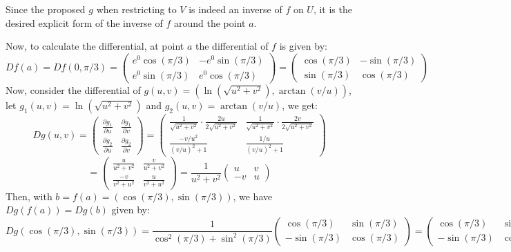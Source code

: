 \documentclass{article}
\begin{document}
\begin{itemize}
    Since the proposed $g$ when restricting to $V$ is indeed an inverse of $f$ on $U$, it is the desired explicit form of the inverse of $f$ around the point $a$.

    \hfil

    Now, to calculate the differential, at point $a$ the differential of $f$ is given by:
    $$Df(a) = Df(0,\pi/3) = \begin{pmatrix}
        e^0\cos(\pi/3) & -e^0\sin(\pi/3)\\
        e^0\sin(\pi/3) & e^0\cos(\pi/3)
    \end{pmatrix} = \begin{pmatrix}
        \cos(\pi/3)&-\sin(\pi/3)\\
        \sin(\pi/3)&\cos(\pi/3)
    \end{pmatrix}$$
    Now, consider the differential of $g(u,v) = (\ln(\sqrt{u^2+v^2}),\arctan(v/u))$, let $g_1(u,v)=\ln(\sqrt{u^2+v^2})$ and $g_2(u,v)=\arctan(v/u)$, we get:
    $$Dg(u,v) = \begin{pmatrix}
        \frac{\partial g_1}{\partial u} & \frac{\partial g_1}{\partial v}\\
        \frac{\partial g_2}{\partial u} & \frac{\partial g_2}{\partial v}
    \end{pmatrix} = \begin{pmatrix}
        \frac{1}{\sqrt{u^2+v^2}}\cdot \frac{2u}{2\sqrt{u^2+v^2}} & \frac{1}{\sqrt{u^2+v^2}}\cdot \frac{2v}{2\sqrt{u^2+v^2}}\\
        \frac{-v/u^2}{(v/u)^2+1} & \frac{1/u}{(v/u)^2+1}
    \end{pmatrix}$$
    $$ = \begin{pmatrix}
        \frac{u}{u^2+v^2} & \frac{v}{u^2+v^2}\\
        \frac{-v}{v^2+u^2} & \frac{u}{v^2+u^2}
    \end{pmatrix} = \frac{1}{u^2+v^2}\begin{pmatrix}
        u&v\\ -v & u
    \end{pmatrix}$$
    Then, with $b = f(a) = (\cos(\pi/3),\sin(\pi/3))$, we have $Dg(f(a)) = Dg(b)$ given by:
    $$Dg(\cos(\pi/3),\sin(\pi/3)) = \frac{1}{\cos^2(\pi/3)+\sin^2(\pi/3)}\begin{pmatrix}
        \cos(\pi/3) & \sin(\pi/3)\\
        -\sin(\pi/3) & \cos(\pi/3)
    \end{pmatrix} = \begin{pmatrix}
        \cos(\pi/3) & \sin(\pi/3)\\
        -\sin(\pi/3) & \cos(\pi/3)
    \end{pmatrix}$$


\end{itemize}
\end{document}
